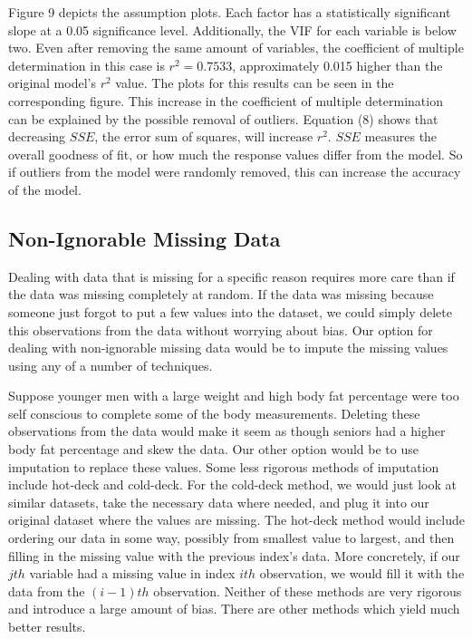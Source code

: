 \documentclass[12pt]{article}
\begin{document}
Figure 9 depicts the assumption plots. Each factor has a statistically significant slope at a 0.05 significance level. Additionally, the VIF for each variable is below two. Even after removing the same amount of variables, the coefficient of multiple determination in this case is $r^2 = 0.7533$, approximately 0.015 higher than the original model's $r^2$ value. The plots for this results can be seen in the corresponding figure. This increase in the coefficient of multiple determination can be explained by the possible removal of outliers. Equation (8) shows that decreasing $SSE$, the error sum of squares, will increase $r^2$. $SSE$ measures the overall goodness of fit, or how much the response values differ from the model. So if outliers from the model were randomly removed, this can increase the accuracy of the model\cite{Tamhane}.























\subsection*{Non-Ignorable Missing Data}

Dealing with data that is missing for a specific reason requires more care than if the data was missing completely at random. If the data was missing because someone just forgot to put a few values into the dataset, we could simply delete this observations from the data without worrying about bias. Our option for dealing with non-ignorable missing data would be to impute the missing values using any of a number of techniques.

\par Suppose younger men with a large weight and high body fat percentage were too self conscious to complete some of the body measurements. Deleting these observations from the data would make it seem as though seniors had a higher body fat percentage and skew the data. Our other option would be to use imputation to replace these values. Some less rigorous methods of imputation include hot-deck and cold-deck. For the cold-deck method, we would just look at similar datasets, take the necessary data where needed, and plug it into our original dataset where the values are missing. The hot-deck  method would include ordering our data in some way, possibly from smallest value to largest, and then filling in the missing value with the previous index's data. More concretely, if our $jth$ variable had a missing value in index $ith$ observation, we would fill it with the data from the $(i-1)th$ observation. Neither of these methods are very rigorous and introduce a large amount of bias. There are other methods which yield much better results. \cite{statfi}
\end{document}
